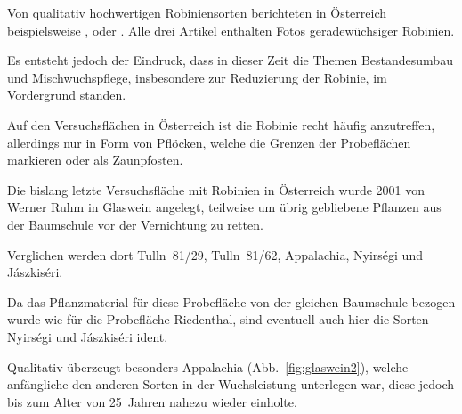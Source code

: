 \documentclass[twocolumn]{scrartcl}
\begin{document}
Von qualitativ hochwertigen Robiniensorten berichteten in Österreich
beispielsweise \citet{mueller1991robinie}, \citet{iby1998robinie} oder
\citet{demel2004robinie}. Alle drei Artikel enthalten Fotos
geradewüchsiger Robinien.

Es entsteht jedoch der Eindruck, dass in dieser Zeit die Themen
Bestandesumbau und Mischwuchspflege, insbesondere zur Reduzierung der
Robinie, im Vordergrund standen.

Auf den Versuchsflächen in Österreich ist die Robinie recht häufig
anzutreffen, allerdings nur in Form von Pflöcken, welche die Grenzen
der Probeflächen markieren oder als Zaunpfosten.

Die bislang letzte Versuchsfläche mit Robinien in Österreich wurde
2001 von Werner Ruhm in Glaswein angelegt, teilweise um übrig
gebliebene Pflanzen aus der Baumschule vor der Vernichtung zu retten.

Verglichen werden dort Tulln~81/29, Tulln~81/62, Appalachia, Nyirségi
und Jászkiséri.

Da das Pflanzmaterial für diese Probefläche von der gleichen
Baumschule bezogen wurde wie für die Probefläche Riedenthal, sind
eventuell auch hier die Sorten Nyirségi und Jászkiséri ident.

Qualitativ überzeugt besonders Appalachia (Abb.~\ref{fig:glaswein2}),
welche anfängliche den anderen Sorten in der Wuchsleistung unterlegen
war, diese jedoch bis zum Alter von 25~Jahren nahezu wieder einholte.
\end{document}
